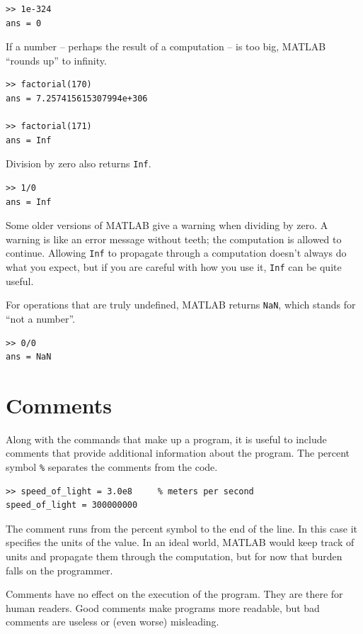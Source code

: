 \documentclass[
]{book}
\begin{document}
\begin{verbatim}
>> 1e-324
ans = 0
\end{verbatim}

If a number -- perhaps the result of a computation -- is too big, 
MATLAB ``rounds up''
to infinity.

\begin{verbatim}
>> factorial(170)
ans = 7.257415615307994e+306

>> factorial(171)
ans = Inf
\end{verbatim}

Division by zero also returns {\tt Inf}.

\begin{verbatim}
>> 1/0
ans = Inf
\end{verbatim}

Some older versions of MATLAB give a warning when dividing by zero.
A warning is like an error message without teeth; the computation
is allowed to continue.  Allowing {\tt Inf} to propagate
through a computation doesn't always do what you expect, but if you
are careful with how you use it, {\tt Inf} can be quite useful.

For operations that are truly undefined, MATLAB returns {\tt NaN},
which stands for ``not a number''.

\begin{verbatim}
>> 0/0
ans = NaN
\end{verbatim}


\section{Comments}

Along with the commands that make up a program, it is useful
to include comments that provide additional information about the
program.  The percent symbol {\tt \%} separates
the comments from the code.

\begin{verbatim}
>> speed_of_light = 3.0e8     % meters per second
speed_of_light = 300000000
\end{verbatim}

The comment runs from the percent symbol to the end of the line.
In this case it specifies the units of the value.  In an ideal world,
MATLAB would keep track of units and propagate them through the
computation, but for now that burden falls on the programmer.

Comments have no effect on the execution of the program.  They
are there for human readers.  Good comments make programs more
readable, but bad comments are useless or (even worse) misleading.
\end{document}
